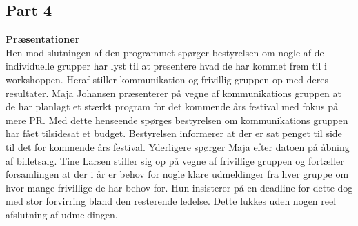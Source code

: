 \subsection{Part 4} 
\noindent \textbf{Præsentationer} \\
Hen mod slutningen af den programmet spørger bestyrelsen om nogle af de individuelle grupper har lyst til at presentere hvad de har kommet frem til i workshoppen. Heraf stiller kommunikation og frivillig gruppen op med deres resultater. 
Maja Johansen præsenterer på vegne af kommunikations gruppen at de har planlagt et stærkt program for det kommende års festival med fokus på mere PR. Med dette henseende spørges bestyrelsen om kommunikations gruppen har fået tilsidesat et budget. Bestyrelsen informerer at der er sat penget til side til det for kommende års festival. Yderligere spørger Maja efter datoen på åbning af billetsalg.
Tine Larsen stiller sig op på vegne af frivillige gruppen og fortæller forsamlingen at der i år er behov for nogle klare udmeldinger fra hver gruppe om hvor mange frivillige de har behov for. Hun insisterer på en deadline for dette dog med stor forvirring bland den resterende ledelse. Dette lukkes uden nogen reel afslutning af udmeldingen.